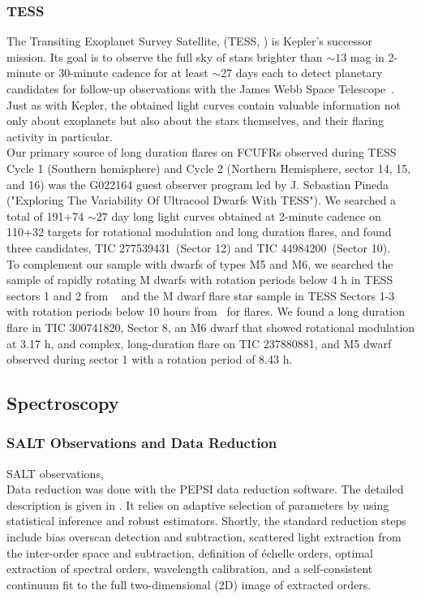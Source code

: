 \documentclass[fleqn,usenatbib,letters]{mnras}%
\newcommand{\FA}{TIC 277539431} %
\newcommand{\FB}{TIC 44984200} %
\newcommand{\FC}{TIC 237880881} %
\newcommand{\FF}{TIC 300741820} %
\begin{document}
\subsubsection{TESS}
\label{sec:photometryTESS}
The Transiting Exoplanet Survey
Satellite, (TESS, \citealt{ricker2015}) is Kepler's successor mission. Its goal is to observe the full sky of stars brighter than $\sim13$ mag in 2-minute or 30-minute cadence for at least $\sim$27 days each to detect planetary candidates for follow-up observations with the James Webb Space Telescope~\citep{gardner2006}. Just as with Kepler, the obtained light curves contain valuable information not only about exoplanets but also about the stars themselves, and their flaring activity in particular.
\\
Our primary source of long duration flares on FCUFRs observed during TESS Cycle 1 (Southern hemisphere) and Cycle 2 (Northern Hemisphere, sector 14, 15, and 16) was the G022164 guest observer program led by J. Sebastian Pineda ("Exploring The Variability Of Ultracool Dwarfs With TESS"). We searched a total of 191+74 $\sim 27$ day long light curves obtained at 2-minute cadence on 110+32 targets for rotational modulation and long duration flares, and found three candidates, \FA~(Sector 12) and \FB~(Sector 10).
\\
To complement our sample with dwarfs of types M5 and M6, we searched the sample of rapidly rotating M dwarfs with rotation periods below 4 h in TESS sectors 1 and 2 from ~\citet{zhan2019} and the M dwarf flare star sample in TESS Sectors 1-3 with rotation periods below 10 hours from~\citet{doyle2019} for flares. We found a long duration flare in \FF, Sector 8, an M6 dwarf that showed rotational modulation at 3.17 h, and complex, long-duration flare on \FC, and M5 dwarf observed during sector 1 with a rotation period of 8.43 h.
\subsection{Spectroscopy}
\label{sec:salt}
\subsubsection{SALT Observations and Data Reduction}
SALT observations,
\\
Data reduction was done with the PEPSI data reduction software. The detailed description is given in
\citet{2018Strassmeier}.
It relies on adaptive selection of parameters by using statistical inference
and robust estimators. Shortly, the standard reduction steps include bias overscan
detection and subtraction, scattered light extraction from the inter-order
space and subtraction, definition of \'echelle orders, optimal extraction of
spectral orders, wavelength calibration, and a self-consistent continuum fit
to the full two-dimensional (2D) image of extracted orders.
\end{document}
